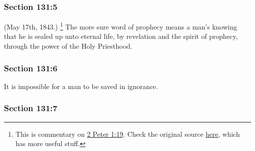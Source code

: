 
	\subsubsection{Section 131:5} %
		\label{DC131-5}

		(May 17th, 1843.)
			\footnote{%
				This is commentary on \hyperref[2PETER-1-19]{2 Peter 1:19}. Check the original source \hyperref[EMS-1843-JS-17-MAY-1843-A-WC]{here}, which has more useful stuff.
				}%
		The more sure word of prophecy means a man's knowing that he is sealed up unto eternal life, by revelation and the spirit of prophecy, through the power of the Holy Priesthood.


	\subsubsection{Section 131:6} %
		\label{DC131-6}

		It is impossible for a man to be saved in ignorance.


	\subsubsection{Section 131:7} %
		\label{DC131-7}

